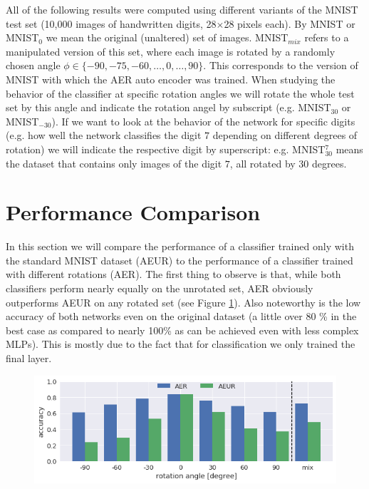 \documentclass[10pt,a4paper]{article}
\begin{document}
\noindent All of the following results were computed using different variants of the MNIST test set (10,000 images of handwritten digits, 28$\times$28 pixels each). By MNIST or MNIST$_{0}$ we mean the original (unaltered) set of images. MNIST$_{mix}$ refers to a manipulated version of this set, where each image is rotated by a randomly chosen angle $\phi \in \{-90, -75, -60, \dots, 0, \dots,  90\}$. This corresponds to the version of MNIST with which the AER auto encoder was trained. \newline
\noindent When studying the behavior of the classifier at specific rotation angles we will rotate the whole test set by this angle and indicate the rotation angel by subscript (e.g. MNIST$_{30}$ or MNIST$_{-30}$). 
If we want to look at the behavior of the network for specific digits (e.g. how well the network classifies the digit $7$ depending on different degrees of rotation) we will indicate the respective digit by superscript: e.g. MNIST$_{30}^{7}$ means the dataset that contains only images of the digit $7$, all rotated by 30 degrees.


\section{Performance Comparison}

\noindent In this section we will compare the performance of a classifier trained only with the standard MNIST dataset (AEUR) to the performance of a classifier trained with different rotations (AER). \newline
The first thing to observe is that, while both classifiers perform nearly equally on the unrotated set, AER obviously outperforms AEUR on any rotated set (see Figure \ref{fig:AERvsAEUR_angles}). Also noteworthy is the low accuracy of both networks even on the original dataset (a little over 80 \% in the best case as compared to nearly 100\% as can be achieved even with less complex MLPs). This is mostly due to the fact that for classification we only trained the final layer. 


\begin{figure}
\includegraphics[width=\linewidth]{AERvsAEUR_angles.png}
  \label{fig:AERvsAEUR_angles}
\end{figure}
\end{document}
